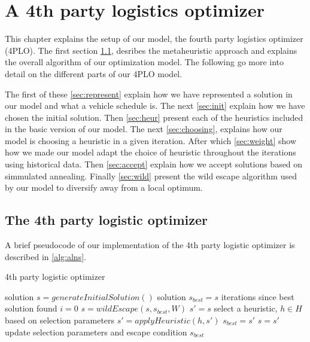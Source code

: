 \documentclass[../main.tex]{subfiles}
\begin{document}
                                                
\chapter{A 4th party logistics optimizer}
\label{ch:appr}
This chapter explains the setup of our model, the fourth party logistics optimizer (4PLO).
The first section \cref{sec:alns}, desribes the metaheuristic approach and explains the overall algorithm of our optimization model. 
The following  go more into detail on the different parts of our 4PLO model.\par
The first of these \cref{sec:represent} explain how we have represented a solution in our model and what a vehicle schedule is.
The next \cref{sec:init} explain how we have chosen the initial solution.
Then \cref{sec:heur} present each of the heuristics included in the basic version of our model.
The next \cref{sec:choosing}, explains how our model is choosing a heuristic in a given iteration.
After which \cref{sec:weight} show how we made our model adapt the choice of heuristic throughout the iterations using historical data.
Then \cref{sec:accept} explain how we accept solutions based on simmulated annealing.
Finally \cref{sec:wild} present the wild escape algorithm used by our model to diversify away from a local optimum.

\section{The 4th party logistic optimizer}
\label{sec:alns}

A brief pseudocode of our implementation of the 4th party logistic optimizer is described in \cref{alg:alns}.  

\begin{algorithm}
    \caption{4th party logistic optimizer}\label{alg:alns}
    \begin{algorithmic}[1]
        \State solution $s = generateInitialSolution()$
        \State solution $s_{best} = s$
        \State iterations since best solution found $i=0$
        \Repeat
             \label{escpCond}
                \State $s = wildEscape(s, s_{best}, W)$ 
            \EndIf
            \State $s' = s$
            \State select a heuristic, $h\in H$ based on selection parameters
            \State $s' = applyHeuristic(h,s')$
                \State $s_{best}=s'$
            \EndIf
                \State $s = s'$
            \EndIf
            \State update selection parameters and escape condition
        \State
        \Return $s_{best}$
        \EndFunction
    \end{algorithmic}
\end{algorithm}
\end{document}
